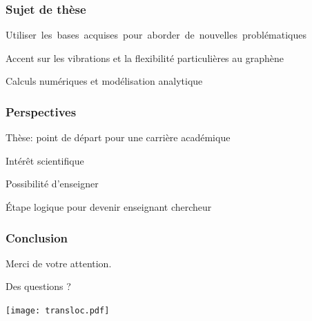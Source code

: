 \documentclass{beamer}
\begin{document}
\frame %
{
  \frametitle{Sujet de thèse}
 
\begin{itemize}
\begin{center}

\item<1-> \mbox{Utiliser les bases acquises pour aborder de nouvelles problématiques}
\medskip
\item<2-> Accent sur les vibrations et la flexibilité particulières au graphène
\medskip

\item<3-> Calculs numériques et modélisation analytique
\medskip
\medskip

 \end{center}
\end{itemize}


}

\frame %
{
  \frametitle{Perspectives}
 

\begin{itemize}
\begin{center}

\item<1-> Thèse: point de départ pour une carrière académique  
\medskip
\item<2-> Intérêt scientifique
\medskip
\item<3-> Possibilité d'enseigner
\medskip
\item<4-> Étape logique pour devenir enseignant chercheur
\medskip

 \end{center}
\end{itemize}

}


\frame %
{
  \frametitle{Conclusion}
 
 
 
 
 \begin{center}
 {\HUGE Merci de votre attention.
 
 
 \pause
 \medskip
 Des questions ?}
 \end{center}
 
 


}

\frame
{\texttt{[image: transloc.pdf]}
}
\end{document}
